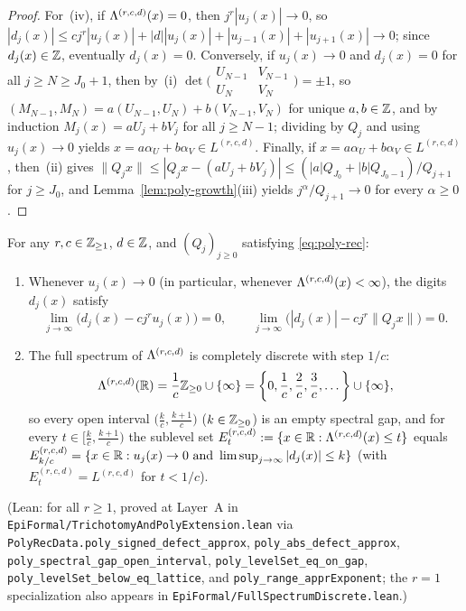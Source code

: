 \begin{proof}
For~(iv), if $\Lambda^{(r,c,d)}(x)=0$, then $j^r|u_j(x)|\to0$, so
$|d_j(x)|\le cj^r|u_j(x)|+|d||u_j(x)|+|u_{j-1}(x)|+|u_{j+1}(x)|\to0$; since
$d_j(x)\in\mathbb{Z}$, eventually $d_j(x)=0$. Conversely, if $u_j(x)\to0$ and $d_j(x)=0$
for all $j\ge N\ge J_0+1$, then by~(i)
$\det\bigl(\begin{smallmatrix}U_{N-1}&V_{N-1}\\U_N&V_N\end{smallmatrix}\bigr)=\pm1$,
so $(M_{N-1},M_N)=a(U_{N-1},U_N)+b(V_{N-1},V_N)$ for unique $a,b\in\mathbb{Z}$, and by
induction $M_j(x)=aU_j+bV_j$ for all $j\ge N-1$; dividing by $Q_j$ and using
$u_j(x)\to0$ yields $x=a\alpha_U+b\alpha_V\in L^{(r,c,d)}$. Finally, if
$x=a\alpha_U+b\alpha_V\in L^{(r,c,d)}$, then~(ii) gives
$\|Q_jx\|\le|Q_jx-(aU_j+bV_j)|\le(|a|Q_{J_0}+|b|Q_{J_0-1})/Q_{j+1}$ for
$j\ge J_0$, and Lemma~\ref{lem:poly-growth}(iii) yields $j^\alpha/Q_{j+1}\to0$
for every $\alpha\ge0$.
\end{proof}

\begin{theorem}\label{thm:general-rec}
For any $r,c\in\mathbb{Z}_{\ge1}$, $d\in\mathbb{Z}$, and $(Q_j)_{j\ge0}$ satisfying
\eqref{eq:poly-rec}:
\begin{enumerate}[label=(\roman*),leftmargin=2em]
\item Whenever $u_j(x)\to0$ (in particular, whenever $\Lambda^{(r,c,d)}(x)<\infty$),
the digits $d_j(x)$ satisfy
\[
\lim_{j\to\infty}\bigl(d_j(x)-cj^ru_j(x)\bigr)=0,\qquad
\lim_{j\to\infty}\bigl(|d_j(x)|-cj^r\|Q_jx\|\bigr)=0.
\]
\item The full spectrum of $\Lambda^{(r,c,d)}$ is completely discrete with step $1/c$:
\[
\Lambda^{(r,c,d)}(\mathbb{R})=\frac{1}{c}\mathbb{Z}_{\ge0}\cup\{\infty\}
=\left\{0,\frac{1}{c},\frac{2}{c},\frac{3}{c},\dots\right\}\cup\{\infty\},
\]
so every open interval $\bigl(\frac{k}{c},\frac{k+1}{c}\bigr)$ ($k\in\mathbb{Z}_{\ge0}$)
is an empty spectral gap, and for every $t\in\bigl[\frac{k}{c},\frac{k+1}{c}\bigr)$
the sublevel set $E_t^{(r,c,d)}:=\{x\in\mathbb{R}:\Lambda^{(r,c,d)}(x)\le t\}$ equals
$E_{k/c}^{(r,c,d)}=\{x\in\mathbb{R}:u_j(x)\to0\text{ and }\limsup_{j\to\infty}|d_j(x)|\le k\}$
(with $E_t^{(r,c,d)}=L^{(r,c,d)}$ for $t<1/c$).
\end{enumerate}
(Lean: for all $r\ge1$, proved at Layer~A in
\texttt{EpiFormal/\allowbreak TrichotomyAndPolyExtension.lean} via
\texttt{PolyRecData.\allowbreak poly\_\allowbreak signed\_\allowbreak defect\_\allowbreak approx},
\texttt{poly\_\allowbreak abs\_\allowbreak defect\_\allowbreak approx},
\texttt{poly\_\allowbreak spectral\_\allowbreak gap\_\allowbreak open\_\allowbreak interval},
\texttt{poly\_\allowbreak levelSet\_\allowbreak eq\_\allowbreak on\_\allowbreak gap},
\texttt{poly\_\allowbreak levelSet\_\allowbreak below\_\allowbreak eq\_\allowbreak lattice}, and
\texttt{poly\_\allowbreak range\_\allowbreak apprExponent}; the $r=1$
specialization also appears in
\texttt{EpiFormal/\allowbreak Full\allowbreak Spectrum\allowbreak Discrete.lean}.)
\end{theorem}

